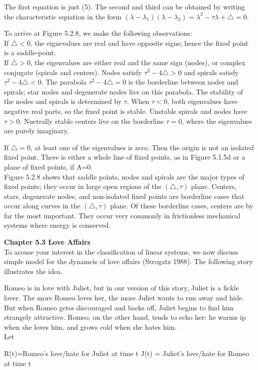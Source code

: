 \documentclass{article}
\newcommand\tab[1][1cm]{\hspace*{#1}}
\begin{document}
The first equation is just (5). The second and third can be obtained by writing the characteristic equation in the form $(\lambda - \lambda_{1})(\lambda-\lambda_{2})= \lambda^{2}-\tau \lambda + \triangle = 0$. \\ \tab

To arrive at Figure 5.2.8, we make the following observations: \\ \tab
If $\triangle < 0$, the eignevalues are real and have opposite signs; hence the fixed point is a saddle-point. \\ \tab
If $\triangle > 0$, the eigenvalues are either real and the same sign (nodes), or complex conjugate (spirals and centers). Nodes satisfy $\tau^{2}-4\triangle > 0$ and spirals satisfy $\tau^{2}-4\triangle < 0$. The parabola $\tau^{2}-4\triangle = 0$ is the borderline between nodes and spirals; star nodes and degenerate nodes live on this parabola. The stability of the nodes and spirals is determined by $\tau$. When $\tau < 0$, both eigenvalues have negative real parts, so the fixed point is stable. Unstable spirals and nodes have $\tau > 0$. Nuetrally stable centers live on the borderline $\tau = 0$, where the eigenvalues are purely imaginary. \\ \tab

If $\triangle = 0$, at least one of the eigenvalues is zero. Then the origin is not an isolated fixed point. There is either a whole line of fixed points, as in Figure 5.1.5d or a plane of fixed points, if A=0. \\ \tab
Figure 5.2.8 shows that saddle points, nodes and spirals are the major types of fixed points; they occur in large open regions of the $(\triangle , \tau)$ plane. Centers, stars, degenerate nodes, and non-isolated fixed points are borderline cases that occur along curves in the $(\triangle , \tau)$ plane. Of these borderline cases, centers are by far the most important. They occur very commonly in frictionless mechanical systems where energy is conserved.

\textbf {Chapter 5.3 Love Affairs} \\
To arouse your interest in the classification of linear systems, we now discuss simple model for the dynamcis of love affairs (Strogatz 1988). The following story illustrates the idea. \\ \tab

Romeo is in love with Juliet, but in our version of this story, Juliet is a fickle lover. The more Romeo loves her, the more Juliet wants to run away and hide. But when Romeo getss discouraged and backs off, Juliet begins to find him strangely attractive. Romeo, on the other hand, tends to echo her: he warms ip when she loves him, and grows cold when she hates him. \\
Let
\begin{center}
R(t)=Romeo's love/hate for Juliet at time t
J(t) = Juliet's love/hate for Romeo at time t
\end{center}
\end{document}
